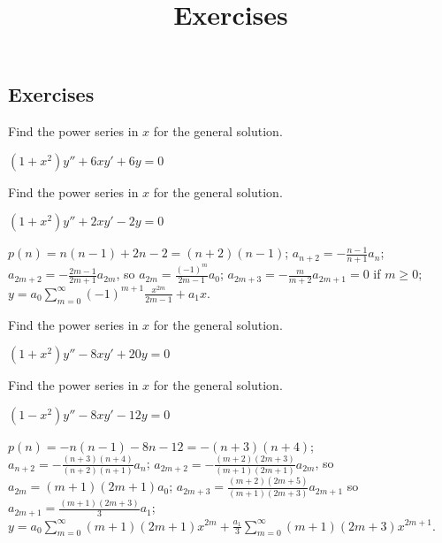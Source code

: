 \documentclass{ximera}
\title{Exercises} \license{CC BY-NC-SA 4.0}
\begin{document}
\begin{abstract}
\end{abstract}
\maketitle

\begin{onlineOnly}
\section*{Exercises}
\end{onlineOnly}


\begin{problem}\label{exer:7.2.1}
Find the power series in $x$ for the general solution.

$(1+x^2)y''+6xy'+6y=0$
\end{problem}

\begin{problem}\label{exer:7.2.2}
Find the power series in $x$ for the general solution.

$(1+x^2)y''+2xy'-2y=0$

\begin{solution}
    $p(n)=n(n-1)+2n-2=(n+2)(n-1)$;
$a_{n+2}=-\frac{n-1}{ n+1}a_n$;
$a_{2m+2}=-\frac{2m-1}{2m+1}a_{2m}$, so
$a_{2m}=\frac{(-1)^m}{2m-1}a_0$;
$a_{2m+3}=-\frac{m}{ m+2}a_{2m+1}=0$
if  $m\geq 0$;
$y=a_0\sum_{m=0}^\infty(-1)^{m+1}\frac{x^{2m}}{2m-1}+a_1x$.
\end{solution}
\end{problem}

\begin{problem}\label{exer:7.2.3}
Find the power series in $x$ for the general solution.

$(1+x^2)y''-8xy'+20y=0$
\end{problem}

\begin{problem}\label{exer:7.2.4} 
Find the power series in $x$ for the general solution.

$(1-x^2)y''-8xy'-12y=0$

\begin{solution}
    $p(n)=-n(n-1)-8n-12=-(n+3)(n+4)$;
$a_{n+2}=-\frac{(n+3)(n+4)}{(n+2)(n+1)}a_n$;
$a_{2m+2}=-\frac{(m+2)(2m+3)}{(m+1)(2m+1)}a_{2m}$, so
$a_{2m}=(m+1)(2m+1)a_0$;
$a_{2m+3}=\frac{(m+2)(2m+5)}{(m+1)(2m+3)}a_{2m+1}$
 so $a_{2m+1}=\frac{(m+1)(2m+3)}{3}a_1$;
$y=a_0\sum_{m=0}^\infty(m+1)(2m+1)x^{2m}+\frac{a_1}{3}\sum_{m=0}^\infty
(m+1)(2m+3)x^{2m+1}$.
\end{solution}
\end{problem}
\end{document}
